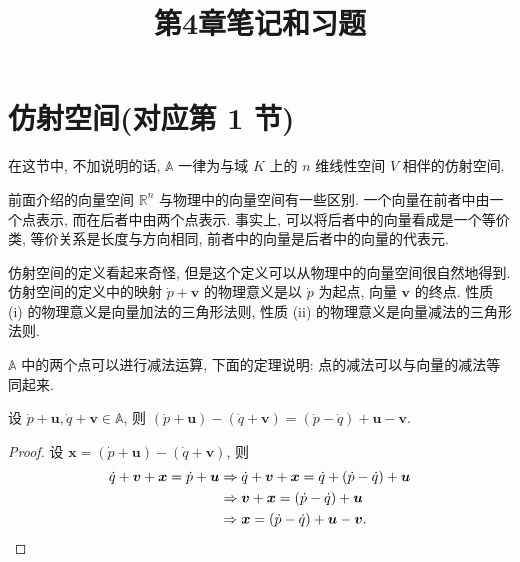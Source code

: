 \documentclass[color=black,device=normal,lang=cn,mode=geye]{elegantnote}
\title{第4章笔记和习题}
\begin{document}
\maketitle
\section{仿射空间(对应第 1 节)}
在这节中, 不加说明的话, $\mathbb{A}$ 一律为与域 $K$ 上的 $n$ 维线性空间 $V$ 相伴的仿射空间.

前面介绍的向量空间 $\mathbb{R}^n$ 与物理中的向量空间有一些区别. 一个向量在前者中由一个点表示, 而在后者中由两个点表示. 事实上, 可以将后者中的向量看成是一个等价类, 等价关系是长度与方向相同, 前者中的向量是后者中的向量的代表元.

仿射空间的定义看起来奇怪, 但是这个定义可以从物理中的向量空间很自然地得到. 仿射空间的定义中的映射 $\dot{p}+\boldsymbol{v}$ 的物理意义是以 $\dot{p}$ 为起点, 向量 $\boldsymbol{v}$ 的终点. 性质 (i) 的物理意义是向量加法的三角形法则, 性质 (ii) 的物理意义是向量减法的三角形法则.

$\mathbb{A}$ 中的两个点可以进行减法运算, 下面的定理说明: 点的减法可以与向量的减法等同起来.
\begin{theorem}
    设 $\dot{p}+\boldsymbol{u},\dot{q}+\boldsymbol{v}\in\mathbb{A}$, 则 $(\dot{p}+\boldsymbol{u})-(\dot{q}+\boldsymbol{v})=(\dot{p}-\dot{q})+\boldsymbol{u}-\boldsymbol{v}$.
\end{theorem}
\begin{proof}
    设 $\boldsymbol{x}=(\dot{p}+\boldsymbol{u})-(\dot{q}+\boldsymbol{v})$, 则
    \begin{align*}
        \dot{q}+\boldsymbol{v}+\boldsymbol{x}=\dot{p}+\boldsymbol{u} & \Rightarrow\dot{q}+\boldsymbol{v}+\boldsymbol{x}=\dot{q}+(\dot{p}-\dot{q})+\boldsymbol{u} \\
        & \Rightarrow\boldsymbol{v}+\boldsymbol{x}=(\dot{p}-\dot{q})+\boldsymbol{u} \\
        & \Rightarrow\boldsymbol{x}=(\dot{p}-\dot{q})+\boldsymbol{u}-\boldsymbol{v}.\qedhere
    \end{align*}
\end{proof}
\end{document}
